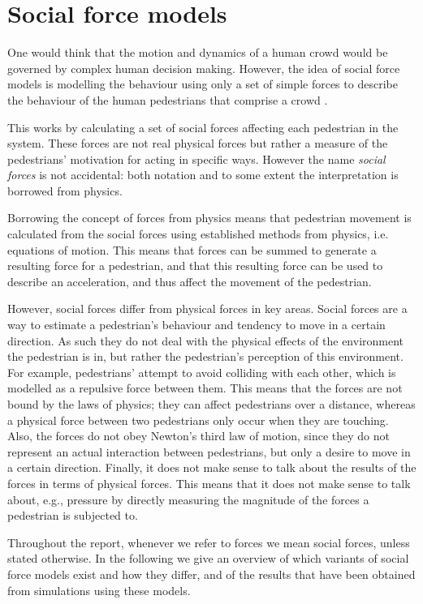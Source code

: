 \section{Social force models}
\label{sec:social-forces}
One would think that the motion and dynamics of a human crowd would be
governed by complex human decision making. However, the idea of social force
models is modelling the behaviour using only a set of simple forces to
describe the behaviour of the human pedestrians that comprise a crowd 
\cite{social-force}.

This works by calculating a set of social forces affecting each pedestrian in 
the system.  These forces are not real physical forces but rather a measure of 
the  pedestrians' motivation for acting in specific ways. However the name 
\emph{social forces} is not accidental: both notation and to some extent the 
interpretation is borrowed from physics.

Borrowing the concept of forces from physics  means that pedestrian movement 
is calculated from the social forces using established methods from physics, 
i.e. equations of motion. This means that forces can be summed to generate a 
resulting force for a pedestrian, and that this resulting force can be used to 
describe an acceleration, and thus affect the movement of the pedestrian.

However, social forces differ from physical forces in key areas. Social forces 
are a way to estimate a pedestrian's behaviour and tendency to move in a 
certain direction. As such they do not deal with the physical effects of the 
environment the pedestrian is in, but rather the pedestrian's perception of 
this environment. For example, pedestrians' attempt to avoid colliding with 
each other, which is modelled as a repulsive force between them. This means 
that the forces are not bound by the laws of physics; they can affect 
pedestrians over a distance, whereas a physical force between two pedestrians 
only occur when they are touching. Also, the forces do not obey Newton's third 
law of motion, since they do not represent an actual interaction between 
pedestrians, but only a desire to move in a certain direction. Finally, it 
does not make sense to talk about the results of the forces in terms of 
physical forces. This means that it does not make sense to talk about, e.g., 
pressure by directly measuring the magnitude of the forces a pedestrian is 
subjected to.

Throughout the report, whenever we refer to forces we mean social forces, 
unless stated otherwise. In the following we give an overview of which 
variants of social force models exist and how they differ, and of the results 
that have been obtained from simulations using these models.

